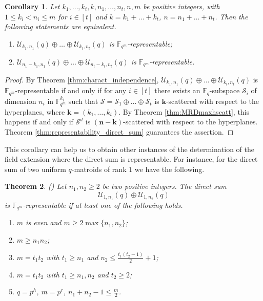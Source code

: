 \documentclass[11pt]{amsart}
\newtheorem{theorem}{Theorem}[section]
\newtheorem{corollary}[theorem]{Corollary}
\newcommand{\mU}{\mathcal{U}}
\newcommand{\mS}{\mathcal{S}}
\newcommand{\fq}{{\mathbb F}_{q}}
\newcommand{\Fm}{\mathbb{F}_{q^m}}
\begin{document}
\begin{corollary}\label{cor:dualdirectsumuniformqmat}
Let $k_1,\ldots,k_t,k,n_1,\ldots,n_t, n, m$ be positive integers, with $1\le k_i< n_i\le m$ for $i \in [t]$ and $k=k_1+\ldots+k_t$, $n=n_1+\ldots+n_t$.
Then the following statements are equivalent.
\begin{enumerate}
    \item $\mU_{k_1,n_1}(q)\oplus\ldots\oplus\mU_{k_t,n_t}(q)$ is $\Fm$-representable;
    \item $\mU_{n_1-k_1,n_1}(q)\oplus\ldots\oplus\mU_{n_t-k_t,n_t}(q)$ is $\Fm$-representable.
\end{enumerate}
\end{corollary}
\begin{proof}
    By Theorem \ref{thm:charact_independence}, $\mU_{k_1,n_1}(q)\oplus\ldots\oplus\mU_{k_t,n_t}(q)$ is $\Fm$-representable if and only if for any $i \in [t]$ there exists an $\fq$-subspace $\mathcal{S}_i$ of dimension $n_i$ in $\Fm^{k_i}$ such that $\mathcal{S}=\mS_1\oplus\ldots\oplus\mS_t$  is $\mathbf{k}$-scattered with respect to the hyperplanes, where $\mathbf{k}=(k_1,\ldots,k_t)$.
    By Theorem \ref{thm:MRDmaxhscatt}, this happens if and only if $\mS^d$ is $(\mathbf{n}-\mathbf{k})$-scattered with respect to the hyperplanes. Theorem \ref{thm:representability_direct_sum} guarantees the assertion.
\end{proof}

This corollary can help us to obtain other instances of the determination of the field extension where the direct sum is representable.
For instance, for the direct sum of two uniform $q$-matroids of rank $1$ we have the following.

\begin{theorem}\label{thm:summary1+1}(\cite[Theorem 4.4]{alfarano2024representability})
    Let $n_1,n_2\geq 2$ be two positive integers. The direct sum
    $$\mU_{1,n_1}(q)\oplus \mU_{1,n_2}(q)$$
    is $\Fm$-representable if at least one of the following holds.
    \begin{enumerate}
       \item $m$ is even and $m\geq 2\max\{n_1,n_2\}$; 
       \item $m\geq n_1n_2$;
       \item $m=t_1t_2$ with $t_1\ge n_1$ and $n_2\le \frac{t_1(t_2-1)}{2}+1$;
       \item $m=t_1t_2$ with $t_1\geq n_1,n_2$ and $t_2\geq 2$;
       \item $q=p^h$, $m=p^r$, $n_1+n_2-1\le \frac{m}{2}$.
    \end{enumerate}
\end{theorem}
\end{document}
